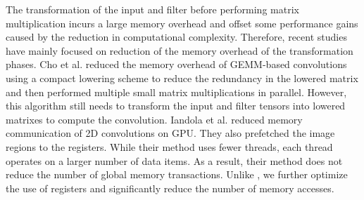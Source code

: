 The transformation of the input and filter before performing matrix multiplication incurs a large memory overhead and offset some
performance gains caused by the reduction in computational complexity. Therefore, recent studies have mainly focused on reduction of
the memory overhead of the transformation phases. Cho et al. \cite{cho2017mec} reduced the memory overhead of GEMM-based convolutions using
a compact lowering scheme to reduce the redundancy in the lowered matrix and then performed multiple small matrix multiplications in
parallel. However, this algorithm still needs to transform the input and filter tensors into lowered matrixes to compute the convolution.
Iandola et al. \cite{Iandola2014Communication} reduced memory communication of 2D convolutions on GPU. They also prefetched the image
regions to the registers. While their method uses fewer threads, each thread operates on a larger number of data items. As a result, their
method does not reduce the number of global memory transactions. Unlike \cite{Iandola2014Communication}, we further optimize the use of
registers and significantly reduce the number of memory accesses.
